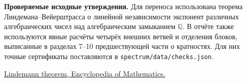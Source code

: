 \documentclass[11pt,a4paper]{article}
\newcommand{\subt}[1]{\par\medskip\noindent\textbf{#1.}\quad}
\newcommand{\QQ}{\mathbb Q}
\begin{document}
\subt{Проверяемые исходные утверждения}
Для переноса использована теорема Линдемана--Вейерштрасса о линейной независимости экспонент различных алгебраических чисел над алгебраическим замыканием \(\QQ\). В отчёте также используются явные расчёты четырёх внешних ветвей и отделения блоков, выписанные в разделах 7--10 предшествующей части о кратностях. Для них точные сертификаты поставляются в \texttt{spectrum/data/checks.json}.

\medskip
\noindent
\href{https://encyclopediaofmath.org/wiki/Lindemann_theorem}{Lindemann theorem, Encyclopedia of Mathematics.}
\end{document}
